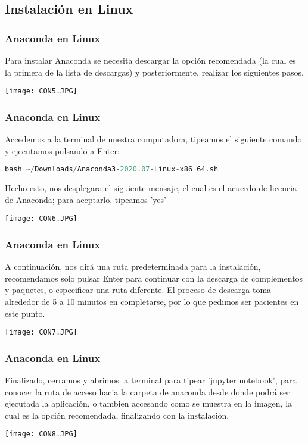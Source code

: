 \documentclass[spanish]{beamer}
\begin{document}
\newpage\subsection{Instalación en Linux}
\begin{frame}\frametitle{Anaconda en Linux}
\setlength{\parskip}{5mm}\justify
Para instalar Anaconda se necesita descargar la opción recomendada (la cual es la primera de la lista de descargas) y posteriormente, realizar los siguientes pasos. 

\centering\texttt{[image: CON5.JPG]}

\end{frame}
\newpage
\begin{frame}[fragile]\frametitle{Anaconda en Linux}
\setlength{\parskip}{5mm}\justify
Accedemos a la terminal de nuestra computadora, tipeamos el siguiente comando y ejecutamos pulsando a Enter:
\begin{lstlisting}[language=c++]
bash ~/Downloads/Anaconda3-2020.07-Linux-x86_64.sh\end{lstlisting}

Hecho esto, nos desplegara el siguiente mensaje, el cual es el acuerdo de licencia de Anaconda; para aceptarlo, tipeamos 'yes'

\centering\texttt{[image: CON6.JPG]}

\end{frame}
\newpage
\begin{frame}[fragile]\frametitle{Anaconda en Linux}
\setlength{\parskip}{5mm}\justify
A continuación, nos dirá una ruta predeterminada para la instalación, recomendamos solo pulsar Enter para continuar con la descarga de complementos y paquetes, o especificar una ruta diferente. El proceso de descarga toma alrededor de 5 a 10 minutos en completarse, por lo que pedimos ser pacientes en este punto.

\centering\texttt{[image: CON7.JPG]}

\end{frame}
\newpage
\begin{frame}[fragile]\frametitle{Anaconda en Linux}
\setlength{\parskip}{5mm}\justify
Finalizado, cerramos y abrimos la terminal para tipear 'jupyter notebook', para conocer la ruta de acceso hacia la carpeta de anaconda desde donde podrá ser ejecutada la aplicación, o tambien accesando como se muestra en la imagen, la cual es la opción recomendada, finalizando con la instalación.

\centering\texttt{[image: CON8.JPG]}

\end{frame}
\end{document}
